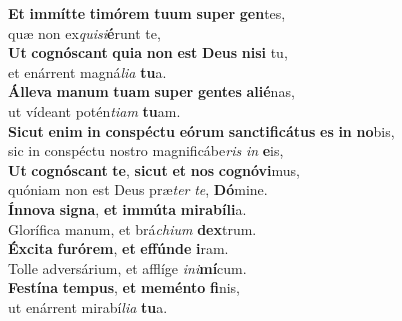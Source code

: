\evenverse \textbf{Et} \textbf{im}\textbf{mít}\textbf{te} \textbf{ti}\textbf{mó}\textbf{rem} \textbf{tu}\textbf{um} \textbf{su}\textbf{per} \textbf{gen}tes,~\*\\
\evenverse quæ non ex\textit{qui}\textit{si}\textbf{é}runt te,\\
\oddverse \textbf{Ut} \textbf{co}\textbf{gnó}\textbf{scant} \textbf{qui}\textbf{a} \textbf{non} \textbf{est} \textbf{De}\textbf{us} \textbf{ni}\textbf{si} tu,~\*\\
\oddverse et enárrent magná\textit{li}\textit{a} \textbf{tu}a.\\
\evenverse \textbf{Ál}\textbf{le}\textbf{va} \textbf{ma}\textbf{num} \textbf{tu}\textbf{am} \textbf{su}\textbf{per} \textbf{gen}\textbf{tes} \textbf{a}\textbf{li}\textbf{é}nas,~\*\\
\evenverse ut vídeant potén\textit{ti}\textit{am} \textbf{tu}am.\\
\oddverse \textbf{Si}\textbf{cut} \textbf{e}\textbf{nim} \textbf{in} \textbf{con}\textbf{spé}\textbf{ctu} \textbf{e}\textbf{ó}\textbf{rum} \textbf{san}\textbf{cti}\textbf{fi}\textbf{cá}\textbf{tus} \textbf{es} \textbf{in} \textbf{no}bis,~\*\\
\oddverse sic in conspéctu nostro magnificábe\textit{ris} \textit{in} \textbf{e}is,\\
\evenverse \textbf{Ut} \textbf{co}\textbf{gnó}\textbf{scant} \textbf{te}, \textbf{si}\textbf{cut} \textbf{et} \textbf{nos} \textbf{co}\textbf{gnó}\textbf{vi}mus,~\*\\
\evenverse quóniam non est Deus præ\textit{ter} \textit{te}, \textbf{Dó}mine.\\
\oddverse \textbf{Ín}\textbf{no}\textbf{va} \textbf{si}\textbf{gna}, \textbf{et} \textbf{im}\textbf{mú}\textbf{ta} \textbf{mi}\textbf{ra}\textbf{bí}\textbf{li}a.~\*\\
\oddverse Glorífica manum, et brá\textit{chi}\textit{um} \textbf{dex}trum.\\
\evenverse \textbf{Éx}\textbf{ci}\textbf{ta} \textbf{fu}\textbf{ró}\textbf{rem}, \textbf{et} \textbf{ef}\textbf{fún}\textbf{de} \textbf{i}ram.~\*\\
\evenverse Tolle adversárium, et afflíge \textit{i}\textit{ni}\textbf{mí}cum.\\
\oddverse \textbf{Fe}\textbf{stí}\textbf{na} \textbf{tem}\textbf{pus}, \textbf{et} \textbf{me}\textbf{mén}\textbf{to} \textbf{fi}nis,~\*\\
\oddverse ut enárrent mirabí\textit{li}\textit{a} \textbf{tu}a.\\
